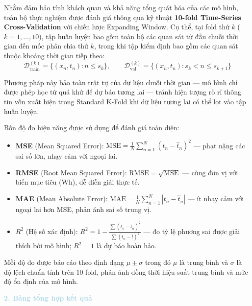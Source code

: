 Nhằm đảm bảo tính khách quan và khả năng tổng quát hóa của các mô hình, 
toàn bộ thực nghiệm được đánh giá thông qua kỹ thuật \textbf{10-fold 
Time-Series Cross-Validation} với chiến lược
Expanding Window. Cụ thể, tại fold thứ $k$ ($k = 1, \ldots, 10$), 
tập huấn luyện bao gồm toàn bộ các quan sát từ đầu chuỗi thời gian đến 
mốc phân chia thứ $k$, trong khi tập kiểm định bao gồm các quan sát 
thuộc khoảng thời gian tiếp theo:
$$\mathcal{D}_{\mathrm{train}}^{(k)} = \{(x_n, t_n) : n \le s_k\}, \qquad
  \mathcal{D}_{\mathrm{val}}^{(k)}   = \{(x_n, t_n) : s_k < n \le s_{k+1}\}$$

Phương pháp này bảo toàn trật tự của dữ liệu chuỗi thời gian --- 
mô hình chỉ được phép học từ quá khứ để dự báo tương lai --- tránh hiện 
tượng rò rỉ thông tin vốn xuất hiện trong Standard K-Fold 
khi dữ liệu tương lai có thể lọt vào tập huấn luyện.

Bốn độ đo hiệu năng được sử dụng để đánh giá toàn diện:
\begin{itemize} [labelsep=10pt, leftmargin=2cm]
    \item \textbf{MSE} (Mean Squared Error): 
    $\mathrm{MSE} = \frac{1}{N}\sum_{n=1}^{N}(t_n - \hat{t}_n)^2$ --- 
    phạt nặng các sai số lớn, nhạy cảm với ngoại lai.
    \item \textbf{RMSE} (Root Mean Squared Error): 
    $\mathrm{RMSE} = \sqrt{\mathrm{MSE}}$ --- cùng đơn vị với biến mục 
    tiêu (Wh), dễ diễn giải thực tế.
    \item \textbf{MAE} (Mean Absolute Error): 
    $\mathrm{MAE} = \frac{1}{N}\sum_{n=1}^{N}|t_n - \hat{t}_n|$ --- 
    ít nhạy cảm với ngoại lai hơn MSE, phản ánh sai số trung vị.
    \item \textbf{$R^2$} (Hệ số xác định): 
    $R^2 = 1 - \frac{\sum(t_n - \hat{t}_n)^2}{\sum(t_n - \bar{t})^2}$ 
    --- đo tỷ lệ phương sai được giải thích bởi mô hình; 
    $R^2 = 1$ là dự báo hoàn hảo.
\end{itemize}

Mỗi độ đo được báo cáo theo định dạng $\mu \pm \sigma$ trong đó $\mu$ 
là trung bình và $\sigma$ là độ lệch chuẩn tính trên 10 fold, phản ánh 
đồng thời hiệu suất trung bình và mức độ ổn định của mô hình.

\noindent\textcolor{lightblue}{\textbf{2. Bảng tổng hợp kết quả}}


